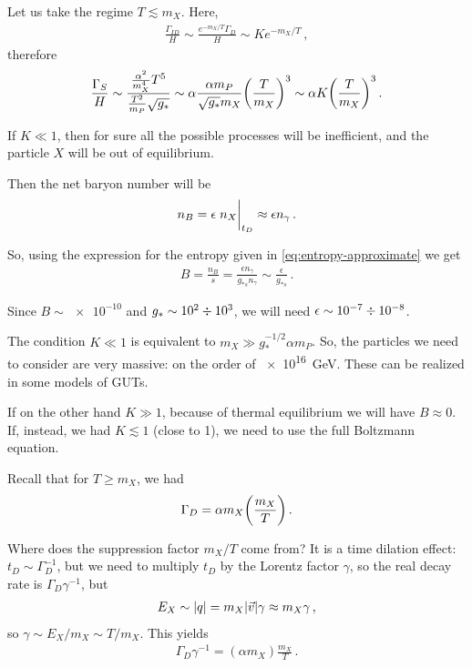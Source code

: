 \documentclass[main.tex]{subfiles}
\begin{document}
Let us take the regime \(T \lesssim m_X\). Here, 
%
\begin{align}
\frac{\Gamma_{ID}}{H} \sim \frac{e^{-m_X / T} \Gamma _D}{H} \sim K e^{-m_X / T}
\,,
\end{align}
%
therefore 
%
\begin{align}
\frac{\Gamma_{S}}{H} \sim\frac{ \frac{\alpha^2}{m_X^{4}} T^{5}}{ \frac{T^2}{m_P} \sqrt{g_*}} 
\sim \alpha \frac{\alpha m_P}{\sqrt{g_*} m_X} \qty( \frac{T}{m_X})^{3}
\sim \alpha K \qty( \frac{T}{m_X})^{3}
\,.
\end{align}

If \(K \ll 1\), then for sure all the possible processes will be inefficient, and the particle \(X\) will be out of equilibrium. 

Then the net baryon number will be 
%
\begin{align}
n_B = \epsilon \eval{n_X}_{t_D} \approx \epsilon n_\gamma 
\,.
\end{align}

So, using the expression for the entropy given in \eqref{eq:entropy-approximate} we get
%
\begin{align} \label{eq:baryon-number}
B = \frac{n_B}{s} = \frac{\epsilon n_\gamma }{g_{*s} n_\gamma } \sim \frac{\epsilon}{g_{*s}}
\,.
\end{align}

Since \(B \sim \num{e-10}\) and \(g_* \sim \num{e2} \divisionsymbol \num{e3}\), we will need \(\epsilon \sim \num{e-7} \divisionsymbol \num{e-8}\). 

The condition \(K \ll 1\) is equivalent to \(m_X \gg g_*^{-1/2} \alpha m_P\). 
So, the particles we need to consider are very massive: on the order of \SI{e16}{GeV}. These can be realized in some models of GUTs.


If on the other hand \(K \gg 1\), because of thermal equilibrium we will have \(B \approx 0\). 
If, instead, we had \(K \lesssim 1\) (close to 1), we need to use the full Boltzmann equation. 

Recall that for \(T \geq m_X\), we had 
%
\begin{align}
\Gamma _D = \alpha  m_X \qty( \frac{m_X}{T})
\,.
\end{align}

Where does the suppression factor \(m_X / T \) come from? 
It is a time dilation effect: \(t_D \sim \Gamma_D^{-1}\), but we need to multiply \(t_D\) by the Lorentz factor \(\gamma \), so the real decay rate is \(\Gamma _D \gamma^{-1} \), but 
%
\begin{align}
E_X \sim \abs{q} = m_X \abs{\vec{v}} \gamma \approx m_X \gamma 
\,,
\end{align}
%
so \(\gamma \sim E_X / m_X \sim T / m_X\). This yields 
%
\begin{align}
\Gamma _D \gamma^{-1} = (\alpha  m_X) \frac{m_X}{T}
\,.
\end{align}
\end{document}
